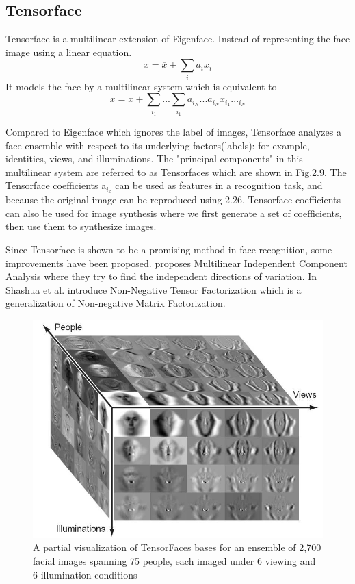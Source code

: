 \documentclass[12pt, twoside]{report}
\begin{document}
	\subsection{Tensorface}
	Tensorface \cite{90} is a multilinear extension of Eigenface. Instead of representing the face image using a linear equation.
	\begin{equation}
	x=\overline{x}+\sum_{i}a_i x_i
	\end{equation}
	It models the face by a multilinear system which is equivalent to
	\begin{equation}
	x=\overline{x}+\sum_{i_1}...\sum_{i_1}a_{i_N}...a_{i_N} x_{i_1}..._{i_N}
	\end{equation}
	\par 
	Compared to Eigenface which ignores the label of images, Tensorface analyzes a face ensemble with respect to its underlying factors(labels): for example, identities, views, and illuminations. The "principal components" in this multilinear system are referred to as Tensorfaces which are shown in Fig.2.9. The Tensorface coefficients a$_{i_k}$ can be used as features in a recognition task, and because the original image can be reproduced using 2.26, Tensorface coefficients can also be used for image synthesis where we first generate a set of coefficients, then use them to synthesize images.

	\newpage

	\par
	Since Tensorface is shown to be a promising method in face recognition, some improvements have been proposed. \cite{92} proposes Multilinear Independent Component Analysis where they try to find the independent directions of variation. In \cite{76} Shashua et al. introduce Non-Negative Tensor Factorization which is a generalization of Non-negative Matrix Factorization.
	\par 
	\begin{figure}
	\includegraphics[width=\textwidth]{img/20_1.png}
	\caption{A partial visualization of TensorFaces bases for an ensemble of 2,700 facial images spanning 75 people, each imaged under 6 viewing and 6 illumination conditions \cite{92}}
	\label{Fig 2.9}
	\end{figure}
\end{document}
